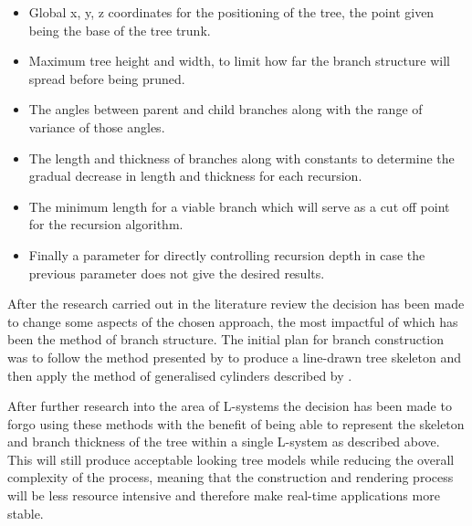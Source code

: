 \documentclass[progress]{cmpreport}
\begin{document}
\begin{itemize}
        \item Global x, y, z coordinates for the positioning of the tree, the point given being 
              the base of the tree trunk.
        \item Maximum tree height and width, to limit how far the branch structure will spread 
              before being pruned.
        \item The angles between parent and child branches along with the range of variance 
              of those angles.
        \item The length and thickness of branches along with constants to determine the gradual 
              decrease in length and thickness for each recursion.
        \item The minimum length for a viable branch which will serve as a cut off point for the 
              recursion algorithm.
        \item Finally a parameter for directly controlling recursion depth in case the previous 
              parameter does not give the desired results.
\end{itemize}

After the research carried out in the literature review the decision has been made to change 
some aspects of the chosen approach, the most impactful of which has been the method of branch 
structure. The initial plan for branch construction was to follow the method presented by 
\cite{runions2007colonization} to produce a line-drawn tree skeleton and then apply the method 
of generalised cylinders described by \cite{bloomenthal1985modeling}. 

After further research 
into the area of L-systems the decision has been made to forgo using these methods with the 
benefit of being able to represent the skeleton and branch thickness of the tree within a single 
L-system as described above. This will still produce acceptable looking tree models while 
reducing the overall complexity of the process, meaning that the construction and rendering 
process will be less resource intensive and therefore make real-time applications more stable.

\clearpage

\end{document}
